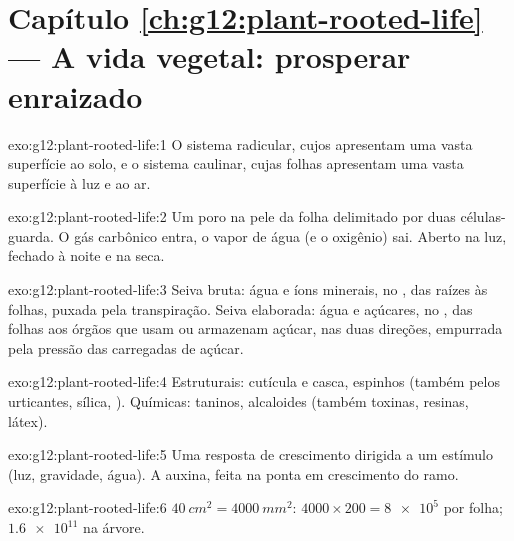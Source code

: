 \section*{Capítulo \ref{ch:g12:plant-rooted-life} --- A vida vegetal: prosperar enraizado}

\begin{solution}{exo:g12:plant-rooted-life:1}
O sistema radicular, cujos  apresentam uma vasta
superfície ao solo, e o sistema caulinar, cujas folhas apresentam uma
vasta superfície à luz e ao ar.
\end{solution}

\begin{solution}{exo:g12:plant-rooted-life:2}
Um poro na pele da folha delimitado por duas células-guarda. O gás
carbônico entra, o vapor de água (e o oxigênio) sai. Aberto na luz,
fechado à noite e na seca.
\end{solution}

\begin{solution}{exo:g12:plant-rooted-life:3}
Seiva bruta: água e íons minerais, no , das raízes às folhas,
puxada pela transpiração. Seiva elaborada: água e açúcares, no ,
das folhas aos órgãos que usam ou armazenam açúcar, nas duas direções,
empurrada pela pressão das  carregadas de açúcar.
\end{solution}

\begin{solution}{exo:g12:plant-rooted-life:4}
Estruturais: cutícula e casca, espinhos (também pelos urticantes,
sílica, ). Químicas: taninos, alcaloides (também
toxinas, resinas, látex).
\end{solution}

\begin{solution}{exo:g12:plant-rooted-life:5}
Uma resposta de crescimento dirigida a um estímulo (luz, gravidade,
água). A auxina, feita na ponta em crescimento do ramo.
\end{solution}

\begin{solution}{exo:g12:plant-rooted-life:6}
$\qty{40}{cm^2} = \qty{4000}{mm^2}$: $4000 \times 200 = \num{8e5}$
 por folha; $\num{1.6e11}$ na árvore.
\end{solution}

